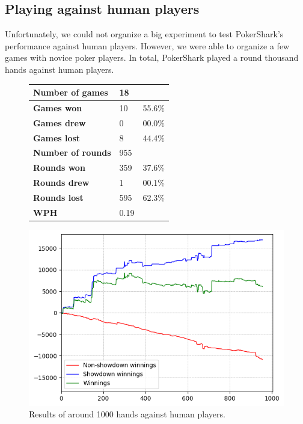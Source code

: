 \subsection{Playing against human players}
Unfortunately, we could not organize a big experiment to test PokerShark's performance against human players. However, we were able to organize a few games with novice poker players. In total, PokerShark played a round thousand hands against human players.

\begin{figure}[H]
    \centering
    \begin{minipage}{\textwidth}
        \begin{minipage}{0.40\textwidth}
            \begin{tabular}{|l|l|l|}
                \hline
                \textbf{Number of games}  & 18   &        \\ \hline
                \textbf{Games won}        & 10    & 55.6\% \\ \hline
                \textbf{Games drew}       & 0     & 00.0\%  \\ \hline
                \textbf{Games lost}       & 8    & 44.4\% \\ \hline
                \textbf{Number of rounds} & 955  &        \\ \hline
                \textbf{Rounds won}       & 359  & 37.6\% \\ \hline
                \textbf{Rounds drew}      & 1     & 00.1\%  \\ \hline
                \textbf{Rounds lost}      & 595  & 62.3\% \\ \hline
                \textbf{WPH}              & 0.19  &        \\ \hline
            \end{tabular}
        \end{minipage}
        \hspace{0.05\textwidth}
        \begin{minipage}{0.5\textwidth}
            \includegraphics[width=\textwidth]{graphics/human.png}
        \end{minipage}
    \end{minipage}
    \caption{Results of around 1000 hands against human players.}
\end{figure}

